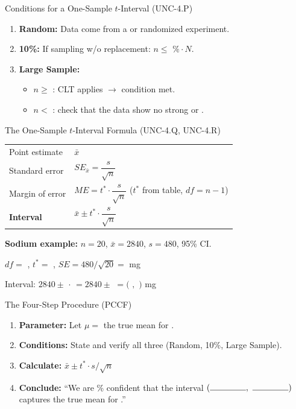 \documentclass[10pt]{article}
\begin{document}
\begin{notesbox}{Conditions for a One-Sample $t$-Interval (UNC-4.P)}
\begin{enumerate}
    \item \textbf{Random:} Data come from a \blank{5cm} or randomized experiment.
    \item \textbf{10\%:} If sampling w/o replacement: $n \le $ \blank{2cm}$\% \cdot N$.
    \item \textbf{Large Sample:}
          \begin{itemize}
              \item $n \ge $ \blank{2cm}: CLT applies $\to$ condition met.
              \item $n < $ \blank{2cm}: check that the data show no strong
                    \blank{4cm} or \blank{3cm}.
          \end{itemize}
\end{enumerate}
\end{notesbox}

\begin{notesbox}{The One-Sample $t$-Interval Formula (UNC-4.Q, UNC-4.R)}
\renewcommand{\arraystretch}{2}
\begin{tabularx}{\linewidth}{lX}
    Point estimate & $\bar x$ \\
    Standard error & $SE_{\bar x} = \dfrac{s}{\sqrt{n}}$ \\
    Margin of error & $ME = t^* \cdot \dfrac{s}{\sqrt{n}}$ \quad ($t^*$ from table, $df = n - 1$) \\
    \textbf{Interval} & $\bar x \pm t^* \cdot \dfrac{s}{\sqrt{n}}$ \\
\end{tabularx}

\vspace{0.1in}
\textbf{Sodium example:} $n = 20$, $\bar x = 2840$, $s = 480$, 95\% CI.

$df = $ \blank{2cm}, \quad $t^* = $ \blank{2.5cm}, \quad $SE = 480/\sqrt{20} = $ \blank{2.5cm} mg

Interval: $2840 \pm $ \blank{2cm} $\cdot$ \blank{2cm} $= 2840 \pm$ \blank{2cm}
$= ($ \blank{2cm}$,$ \blank{2cm}$)$ mg
\end{notesbox}

\begin{notesbox}{The Four-Step Procedure (PCCF)}
\begin{enumerate}
    \item \textbf{Parameter:} Let $\mu = $ the true mean \blank{4cm} for \blank{4cm}.
    \item \textbf{Conditions:} State and verify all three (Random, 10\%, Large Sample).
    \item \textbf{Calculate:} $\bar x \pm t^* \cdot s/\sqrt{n}$
    \item \textbf{Conclude:} ``We are \blank{2cm}\% confident that the interval
          $(\rule{1.5cm}{0.4pt},\ \rule{1.5cm}{0.4pt})$ captures the true mean
          \blank{4cm} for \blank{4cm}.''
\end{enumerate}
\end{notesbox}
\end{document}

